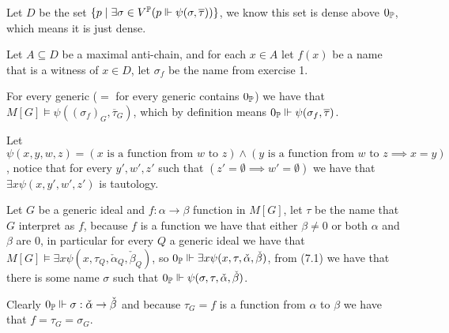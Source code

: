 \begin{cExercise}[][][author][7]
	\begin{cPart}
		Let $D$ be the set $\{p\mid \exists \sigma\in V^\Bbb P (p\Vdash \psi(\sigma, \overline{\tau}))\}$, we know this set is dense above $0_\Bbb P$, which means it is just dense.
		
		Let $A\subseteq D$ be a maximal anti-chain, and for each $x\in A$ let $f(x)$ be a name that is a witness of $x\in D$, let $\sigma_f$ be the name from exercise 1.
		
		For every generic ($=$ for every generic contains $0_\Bbb P$) we have that $M[G]\models \psi((\sigma_f)_G,\overline{\tau}_G)$, which by definition means $0_\Bbb P\Vdash \psi(\sigma_f, \overline{\tau})$.
	\end{cPart}
	\begin{cPart}
		Let $\psi(x,y,w,z)=(x \text{ is a function from $w$ to $z$})\land (y\text{ is a function from $w$ to $z$}\implies x=y)$, notice that for every $y',w',z'$ such that $(z'=\emptyset\implies w'=\emptyset)$ we have that $\exists x\psi(x,y',w',z')$ is tautology.
		
		Let $G$ be a generic ideal and $f:\alpha\to\beta$ function in $M[G]$, let $\tau$ be the name that $G$ interpret as $f$, because $f$ is a function we have that either $\beta\ne 0$ or both $\alpha$ and $\beta$ are $0$, in particular for every $Q$ a generic ideal we have that $M[G]\models\exists x\psi(x,\tau_Q,\check{\alpha}_Q,\check{\beta}_Q)$, so $0_\Bbb P\Vdash \exists x\psi(x,\tau,\check{\alpha},\check{\beta})$, from (7.1) we have that there is some name $\sigma$ such that $0_\Bbb P\Vdash \psi(\sigma,\tau,\check{\alpha},\check{\beta})$.
		
		Clearly $0_\Bbb P\Vdash \sigma:\check{\alpha}\to\check{\beta}$ and because $\tau_G=f$ is a function from $\alpha$ to $\beta$ we have that $f=\tau_G=\sigma_G$.
	\end{cPart}
\end{cExercise}





